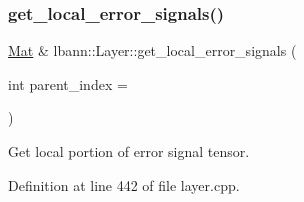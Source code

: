 \subsubsection{\texorpdfstring{get\+\_\+local\+\_\+error\+\_\+signals()}{get\_local\_error\_signals()}\hspace{0.1cm}{\footnotesize\ttfamily [1/2]}}
{\footnotesize\ttfamily \hyperlink{base_8hpp_a68f11fdc31b62516cb310831bbe54d73}{Mat} \& lbann\+::\+Layer\+::get\+\_\+local\+\_\+error\+\_\+signals (\begin{DoxyParamCaption}\item[{int}]{parent\+\_\+index = {} }\end{DoxyParamCaption})}

Get local portion of error signal tensor. 

Definition at line 442 of file layer.\+cpp.


